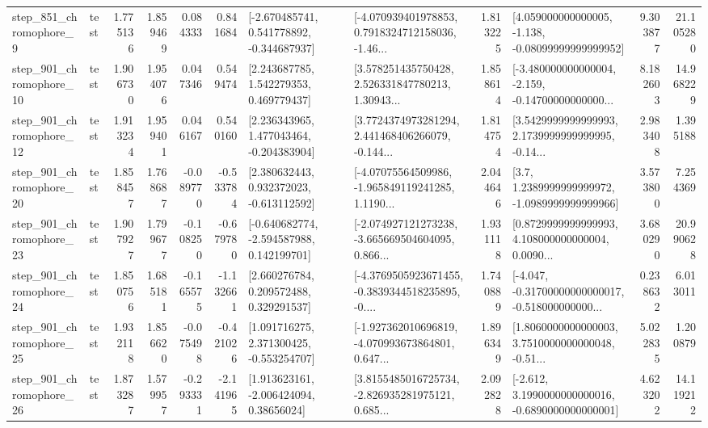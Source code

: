 \begin{tabular}{llrrrrllrlrr}
   step\_851\_chromophore\_9 &      test &      1.775136 &    1.859469 &      0.084333 &  0.841684 &   [-2.670485741, 0.541778892, -0.344687937] &  [-4.070939401978853, 0.7918324712158036, -1.46... &       1.813225 &  [4.059000000000005, -1.138, -0.08099999999999952] &            9.303877 &         21.105280 \\
  step\_901\_chromophore\_10 &      test &      1.906730 &    1.954076 &      0.047346 &  0.549474 &     [2.243687785, 1.542279353, 0.469779437] &  [3.578251435750428, 2.526331847780213, 1.30943... &       1.858614 &  [-3.480000000000004, -2.159, -0.14700000000000... &            8.182603 &         14.968229 \\
  step\_901\_chromophore\_12 &      test &      1.913234 &    1.959401 &      0.046167 &  0.540160 &    [2.236343965, 1.477043464, -0.204383904] &  [3.7724374973281294, 2.441468406266079, -0.144... &       1.814754 &  [3.5429999999999993, 2.1739999999999995, -0.14... &            2.983408 &          1.395188 \\
  step\_901\_chromophore\_20 &      test &      1.858457 &    1.768687 &     -0.089770 & -0.533784 &    [2.380632443, 0.932372023, -0.613112592] &  [-4.07075564509986, -1.965849119241285, 1.1190... &       2.044646 &     [3.7, 1.2389999999999972, -1.0989999999999966] &            3.573800 &          7.254369 \\
  step\_901\_chromophore\_23 &      test &      1.907927 &    1.799677 &     -0.108250 & -0.679780 &   [-0.640682774, -2.594587988, 0.142199701] &  [-2.074927121273238, -3.665669504604095, 0.866... &       1.931118 &  [0.8729999999999993, 4.108000000000004, 0.0090... &            3.680290 &         20.990628 \\
  step\_901\_chromophore\_24 &      test &      1.850756 &    1.685181 &     -0.165575 & -1.132661 &     [2.660276784, 0.209572488, 0.329291537] &  [-4.3769505923671455, -0.3839344518235895, -0.... &       1.740889 &  [-4.047, -0.31700000000000017, -0.518000000000... &            0.238632 &          6.013011 \\
  step\_901\_chromophore\_25 &      test &      1.932118 &    1.856620 &     -0.075498 & -0.421026 &    [1.091716275, 2.371300425, -0.553254707] &  [-1.927362010696819, -4.070993673864801, 0.647... &       1.896349 &  [1.8060000000000003, 3.7510000000000048, -0.51... &            5.022835 &          1.200879 \\
  step\_901\_chromophore\_26 &      test &      1.873287 &    1.579957 &     -0.293331 & -2.141965 &     [1.913623161, -2.006424094, 0.38656024] &  [3.8155485016725734, -2.826935281975121, 0.685... &       2.092828 &  [-2.612, 3.1990000000000016, -0.6890000000000001] &            4.623202 &         14.119212 \\

\end{tabular}
